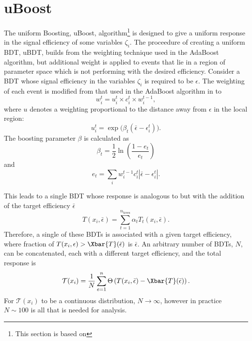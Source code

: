 \section{uBoost}
\label{sec:bdt:uboost}
The uniform Boosting, uBoost, algorithm\footnote{
  This section is based on } is designed to give a uniform
response in the signal efficiency of some variables $\zeta_i$.
The proceedure of creating a uniform BDT, uBDT, builds from the weighting technique used in the
AdaBoost algorithm, but additional weight is applied to events that lie in a region of parameter
space which is not performing with the desired efficiency.
Consider a BDT whose signal efficiency in the variables $\zeta_i$ is required to be $\epsilon$.
The weighting of each event is modified from that used in the AdaBoost algorithm in 
to
\begin{equation}
  w_i^t = u_i^t\times c_i^t \times w_i^{t-1},
\end{equation}
where $u$ denotes a weighting proportional to the distance away from $\epsilon$ in the local
region:
\begin{equation}
  u_i^t = \exp\big(\beta_t(\bar\epsilon-\epsilon_i^t)\big).
\end{equation}
The boosting parameter $\beta$ is calculated as
\begin{equation}
  \beta_t = \frac12\ln\left(\frac{1-e_t}{e_t}\right)
\end{equation}
and
\begin{equation}
  e_t = \sum_i w_i^{t-1}c_i^t\left|\bar\epsilon-\epsilon_i^t\right|.
\end{equation}

This leads to a single BDT whose response is analogous to  but with the addition
of the target efficiency $\bar\epsilon$
\begin{equation}
  T(x_i,\bar\epsilon) = \sum_{t=1}^{n_\mathrm{trees}} \alpha_tT_t(x_i,\bar\epsilon).
  \label{eq:ada:fullbdt}
\end{equation}
Therefore, a single of these BDTs is associated with a given target efficiency, where
fraction of $T(x_i,\epsilon)>\Xbar{T}(\bar\epsilon)$ is $\bar\epsilon$.
An arbitrary number of BDTs, $N$, can be concatenated, each with a different target efficiency, and
the total response is
\begin{equation}
  \mathcal{T}(x_i) =
  \frac1N\sum_{e=1}^{n}\Theta\left(T(x_i, \bar\epsilon) - \Xbar{T}(\bar\epsilon)\right).
\end{equation}
For $\mathcal{T}(x_i)$ to be a continuous distribution, $N\!\to\infty$, however in practice
$N\sim100$ is all that is needed for analysis.






